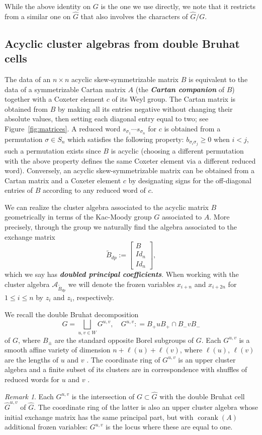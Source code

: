 \documentclass[12pt]{amsart}
\newcommand{\newword}[1]{\textbf{\emph{#1}}}
\newcommand{\cA}{\mathcal{A}}
\DeclareMathOperator{\corank}{corank}
\newcommand{\ol}[1]{\overline{#1}}
\newcommand{\Bdp}{\widetilde{B}_{dp}}
\newcommand{\cvar}{z}
\theoremstyle{remark}
\newtheorem{remark}[theorem]{Remark}
\numberwithin{equation}{section}
\numberwithin{figure}{section}
\begin{document}
While the above identity on $G$ is the one we use directly, we note that it restricts from a similar one on $\widehat{G}$ that also involves the characters of $\widehat{G}/G$.

\subsection{Acyclic cluster algebras from double Bruhat cells}\label{sec:Coxeterdbc}

The data of an $n\times n$ acyclic skew-symmetrizable matrix $B$ is equivalent to the data of a symmetrizable Cartan matrix $A$ (the \newword{Cartan companion} of $B$) together with a Coxeter element $c$ of its Weyl group.
The Cartan matrix is obtained from $B$ by making all its entries negative without changing their absolute values, then setting each diagonal entry equal to two; see Figure~\ref{fig:matrices}.
A reduced word $s_{\sigma_1}\cdots s_{\sigma_n}$ for $c$ is obtained from a permutation $\sigma \in S_n$ which satisfies the following property: $b_{\sigma_i \sigma_j} \geq 0$ when $i < j$, such a permutation exists since $B$ is acyclic (choosing a different permutation with the above property defines the same Coxeter element via a different reduced word).
Conversely, an acyclic skew-symmetrizable matrix can be obtained from a Cartan matrix and a Coxeter element $c$ by designating signs for the off-diagonal entries of $B$ according to any reduced word of $c$.

We can realize the cluster algebra associated to the acyclic matrix $B$ geometrically in terms of the Kac-Moody group $G$ associated to $A$.
More precisely, through the group we naturally find the algebra associated to the exchange matrix
\[
  \Bdp := \begin{bmatrix} B \\ Id_n \\ Id_n \end{bmatrix},
\]
which we say has \newword{doubled principal coefficients}.
When working with the cluster algebra $\cA_{\Bdp}$ we will denote the frozen variables $x_{i+n}$ and $x_{i+2n}$ for $1 \leq i \leq n$ by $\cvar_i$ and $\cvar_{\ol{\imath}}$, respectively.

We recall the double Bruhat decomposition
\[
  G = \bigsqcup_{u,v \in W} G^{u,v},\quad G^{u,v} : = B_+ u B_+ \cap B_- v B_-
\]
of $G$, where $B_{\pm}$ are the standard opposite Borel subgroups of $G$.
Each $G^{u,v}$ is a smooth affine variety of dimension $n + \ell(u) + \ell(v)$, where $\ell(u)$, $\ell(v)$ are the lengths of $u$ and $v$ \cite{FZ99,Wil13}.
The coordinate ring of $G^{u,v}$ is an upper cluster algebra and a finite subset of its clusters are in correspondence with shuffles of reduced words for $u$ and $v$ \cite{BFZ05,Wil13}.
\begin{remark}
  Each $G^{u,v}$ is the intersection of $G \subset \widehat{G}$ with the double Bruhat cell $\widehat{G}^{u,v}$ of $\widehat{G}$.
  The coordinate ring of the latter is also an upper cluster algebra whose initial exchange matrix has the same principal part, but with $\corank(A)$ additional frozen variables: $G^{u,v}$ is the locus where these are equal to one.
\end{remark}
\end{document}
